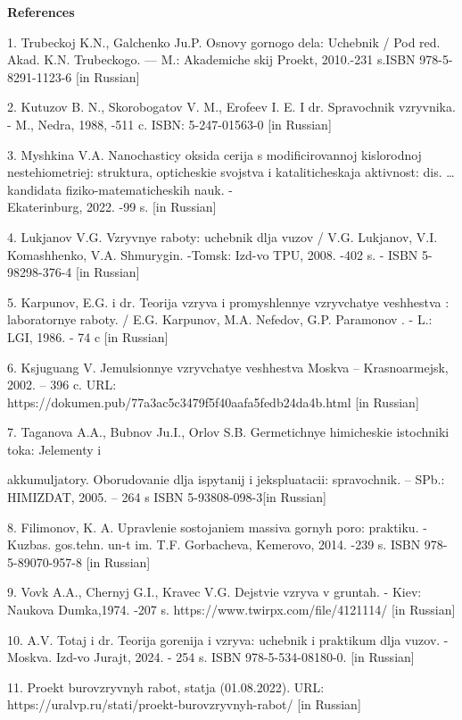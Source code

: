 \begin{center}
{\bfseries References}
\end{center}

\begin{noparindent}
1. Trubeckoj K.N., Galchenko Ju.P. Osnovy gornogo dela: Uchebnik / Pod
red. Akad. K.N. Trubeckogo. --- M.: Akademiche skij Proekt, 2010.-231
s.ISBN 978-5-8291-1123-6 {[}in Russian{]}

2. Kutuzov B. N., Skorobogatov V. M., Erofeev I. E. I dr. Spravochnik
vzryvnika. - M., Nedra, 1988, -511 c. ISBN: 5-247-01563-0 {[}in
Russian{]}

3. Myshkina V.A. Nanochasticy oksida cerija s modificirovannoj
kislorodnoj nestehiometriej: struktura, opticheskie svojstva i
kataliticheskaja aktivnost\textquotesingle: dis. \ldots{} kandidata
fiziko-matematicheskih nauk. -\\Ekaterinburg, 2022. -99 s. {[}in
Russian{]}

4. Luk\textquotesingle janov V.G. Vzryvnye raboty: uchebnik dlja vuzov /
V.G. Luk\textquotesingle janov, V.I. Komashhenko, V.A. Shmurygin.
-Tomsk: Izd-vo TPU, 2008. -402 s. - ISBN 5-98298-376-4 {[}in Russian{]}

5. Karpunov, E.G. i dr. Teorija vzryva i promyshlennye vzryvchatye
veshhestva : laboratornye raboty. / E.G. Karpunov, M.A. Nefedov, G.P.
Paramonov . - L.: LGI, 1986. - 74 c {[}in Russian{]}

6. Ksjuguang V. Jemul\textquotesingle sionnye vzryvchatye veshhestva
Moskva -- Krasnoarmejsk, 2002. -- 396 c. URL:
https://dokumen.pub/77a3ac5c3479f5f40aafa5fedb24da4b.html {[}in
Russian{]}

7. Taganova A.A., Bubnov Ju.I., Orlov S.B. Germetichnye himicheskie
istochniki toka: Jelementy i

akkumuljatory. Oborudovanie dlja ispytanij
i jekspluatacii: spravochnik. -- SPb.: HIMIZDAT, 2005. -- 264 s ISBN
5-93808-098-3{[}in Russian{]}

8. Filimonov, K. A. Upravlenie sostojaniem massiva gornyh poro:
praktiku. -Kuzbas. gos.tehn. un-t im. T.F. Gorbacheva, Kemerovo, 2014.
-239 s. ISBN 978-5-89070-957-8 {[}in Russian{]}

9. Vovk A.A., Chernyj G.I., Kravec V.G. Dejstvie vzryva v gruntah. -
Kiev: Naukova Dumka,1974. -207 s. https://www.twirpx.com/file/4121114/
{[}in Russian{]}

10. A.V. Totaj i dr. Teorija gorenija i vzryva: uchebnik i praktikum
dlja vuzov. -Moskva. Izd-vo Jurajt, 2024. - 254 s. ISBN
978-5-534-08180-0. {[}in Russian{]}

11. Proekt burovzryvnyh rabot, stat\textquotesingle ja (01.08.2022).
URL: https://uralvp.ru/stati/proekt-burovzryvnyh-rabot/ {[}in Russian{]}
\end{noparindent}

